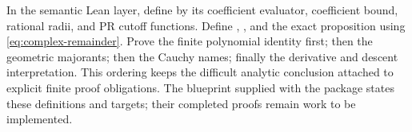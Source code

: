 In the semantic Lean layer, define  by its coefficient evaluator, coefficient bound, rational radii, and PR cutoff functions. Define , , and the exact proposition  using \eqref{eq:complex-remainder}. Prove the finite polynomial identity first; then the geometric majorants; then the Cauchy names; finally the derivative and descent interpretation. This ordering keeps the difficult analytic conclusion attached to explicit finite proof obligations. The blueprint supplied with the package states these definitions and targets; their completed  proofs remain work to be implemented.
